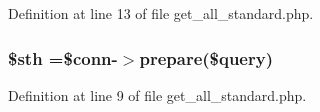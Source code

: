 Definition at line 13 of file get\-\_\-all\-\_\-standard.\-php.

\hypertarget{get__all__standard_8php_afa9126f9664959c02795be300a135f93}{
\subsubsection[{\$sth}]{\setlength{\rightskip}{0pt plus 5cm}\$sth =\$conn-\/$>$prepare(\$query)}}\label{get__all__standard_8php_afa9126f9664959c02795be300a135f93}


Definition at line 9 of file get\-\_\-all\-\_\-standard.\-php.

